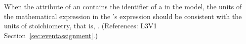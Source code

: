 When the  attribute of an \EventAssignment
contains the identifier of a \SpeciesReference in the model, the
units of the mathematical expression in the
\EventAssignment's  expression should be
consistent with the units of stoichiometry,
that is, .
(References: L3V1 Section~\ref{sec:eventassignment}.)
